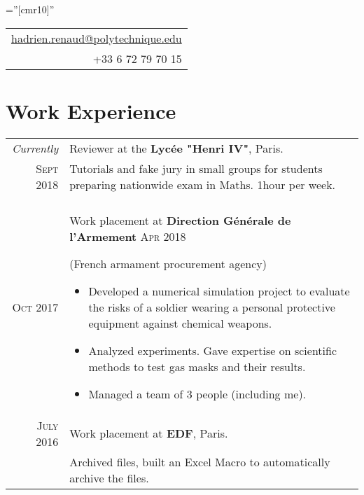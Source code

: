 \documentclass[a4paper,10pt]{article} %
\begin{document}
\pagestyle{empty} %

\font\fb=''[cmr10]'' %



\par{\hfill{}\hfill
\begin{tabular}{r}
\href{mailto:hadrien.renaud@polytechnique.edu}{hadrien.renaud@polytechnique.edu}\\
+33 6 72 79 70 15
\end{tabular}
\bigskip\par} %



\section{Work Experience}

\begin{tabularx}{\linewidth}{r|X}
  \emph{Currently} & Reviewer at the \textbf{Lycée "Henri IV"}, Paris.\\
  \textsc{Sept 2018} & \small{Tutorials and fake jury in small groups for students preparing nationwide exam in Maths. 1hour per week.}
  \\&\\

\textsc{Oct 2017} & Work placement at \textbf{Direction Générale de l'Armement}
\textsc{Apr 2018}  \small{(French armament procurement agency)
\begin{itemize}[noitemsep, nolistsep, leftmargin=0.5cm]
  \item Developed a numerical simulation project to evaluate the risks of a soldier wearing a personal protective equipment against chemical weapons.
  \item Analyzed experiments. Gave expertise on scientific methods to test gas masks and their results.
  \item Managed a team of 3 people (including me).
\end{itemize}}\\


\textsc{July 2016} & Work placement at \textbf{EDF}, Paris. \\
& \small{Archived files, built an Excel Macro to automatically archive the files.}
\end{tabularx}
\end{document}
